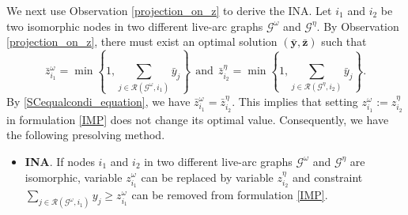 \documentclass[a4paper,10pt]{article}
\theoremstyle{plain}
\newtheorem{proposition}[theorem]{Proposition}
\begin{document}
	We next use Observation \ref{projection_on_z} to derive the INA.
	Let $i_1$ and $i_2$ be two isomorphic nodes in two different live-arc graphs $\mathcal{G}^\omega$ and $\mathcal{G}^\eta$.
	By Observation \ref{projection_on_z}, 
	there must exist an optimal solution $(\boldsymbol{\bar{y}},\boldsymbol{\bar{z}})$ such that
	$$\bar{z}_{i_1}^{\omega} = \min\left \{1, \sum_{j\in \mathcal{R}(\mathcal{G}^{\omega},i_1)}\bar{y}_j\right \}~~\text {and}~~\bar{z}_{i_2}^{\eta} = \min\left\{1, 
	\sum_{j\in \mathcal{R}(\mathcal{G}^{\eta},i_2)}\bar{y}_j\right\}.$$
	By \eqref{SCequalcondi_equation}, we have $\bar{z}_{i_1}^{\omega} = \bar{z}_{i_2}^{\eta}$.
	This implies that setting $z_{i_1}^{\omega}:=z_{i_2}^{\eta}$ in formulation \eqref{IMP} does not change its optimal value.
	Consequently, we have the following presolving method.
	\begin{itemize}
		\item [] {\bf INA}. If nodes $i_1$ and $i_2$  in two different live-arc graphs $\mathcal{G}^\omega$ and $\mathcal{G}^\eta$ are isomorphic,  variable $z_{i_1}^{\omega}$ can be replaced by variable $z_{i_2}^{\eta}$  and  constraint $
		\sum_{j\in \mathcal{R}(\mathcal{G}^{\omega},i_1)}y_j\geq z_{i_1}^{\omega}
		$  can be removed
		from formulation \eqref{IMP}.
	\end{itemize}
\end{document}
